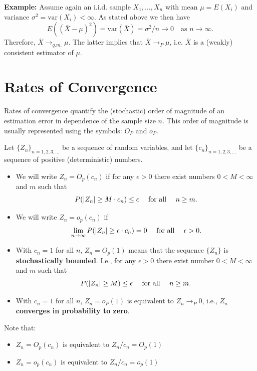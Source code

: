 \documentclass[]{book}
\providecommand{\tightlist}{%
  \setlength{\itemsep}{0pt}\setlength{\parskip}{0pt}}
\theoremstyle{definition}
\theoremstyle{definition}
\theoremstyle{definition}
\theoremstyle{remark}
\begin{document}
\textbf{Example:} Assume again an i.i.d. sample \(X_1,\dots,X_n\) with mean \(\mu=E(X_i)\) and variance \(\sigma^2=\textrm{var}(X_i)<\infty\). As stated above we then have
\[E\left((\bar X-\mu)^2\right)=\textrm{var}(\bar X)=\sigma^2/n\rightarrow 0 \quad \text{as } n\rightarrow\infty.\]
Therefore, \(\bar X \to_{q.m.} \mu\). The latter implies that \(\bar X \to_{P} \mu\), i.e. \(\bar X\) is a (weakly) consistent estimator of \(\mu\).

\hypertarget{rates-of-convergence}{%
\section{Rates of Convergence}\label{rates-of-convergence}}

Rates of convergence quantify the (stochastic) order of magnitude of an estimation error in dependence of the
sample size \(n\). This order of magnitude is usually represented using the symbols: \(O_P\) and \(o_P\).

Let \(\{Z_n\}_{n=1,2,3,\dots}\) be a sequence of random variables, and let \(\{c_n\}_{n=1,2,3,\dots}\) be a sequence of positive (deterministic) numbers.

\begin{itemize}
\tightlist
\item
  We will write \(Z_n=O_p(c_n)\) if for any \(\epsilon>0\) there exist numbers \(0<M<\infty\) and \(m\) such that
  \[P(|Z_n|\ge M\cdot c_n)\leq\epsilon\quad\hbox{ for all }\quad n\geq m.\]
\item
  We will write \(Z_n=o_p(c_n)\) if
  \[\lim_{n\to\infty} P(|Z_n|\geq\epsilon\cdot c_n)=0\quad\hbox{ for all }\quad \epsilon>0.\]
\item
  With \(c_n=1\) for all \(n\), \(Z_n=O_p(1)\) means that the sequence \(\{Z_n\}\) is \textbf{stochastically bounded}. I.e., for any \(\epsilon>0\) there exist number \(0<M<\infty\) and \(m\) such that
  \[P(|Z_n|\geq M)\leq\epsilon\quad\hbox{ for all }\quad n\geq m.\]
\item
  With \(c_n=1\) for all \(n\), \(Z_n=o_P(1)\) is equivalent to \(Z_n\to_{P} 0\), i.e., \(Z_n\) \textbf{converges in probability to zero}.
\end{itemize}

Note that:

\begin{itemize}
\tightlist
\item
  \(Z_n=O_p(c_n)\) is equivalent to \(Z_n/c_n=O_p(1)\)
\item
  \(Z_n=o_p(c_n)\) is equivalent to \(Z_n/c_n=o_p(1)\)
\end{itemize}
\end{document}
